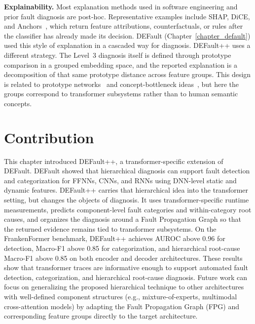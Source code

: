 \textbf{Explainability.}
Most explanation methods used in software engineering and prior fault diagnosis are post-hoc. Representative examples include SHAP, DiCE, and Anchors~\cite{lundberg2017unified,mothilal2020dice,ribeiro2018anchors}, which return feature attributions, counterfactuals, or rules after the classifier has already made its decision. DEFault (Chapter~\ref{chapter_default}) used this style of explanation in a cascaded way for diagnosis. DEFault++ uses a different strategy. The Level~3 diagnosis itself is defined through prototype comparison in a grouped embedding space, and the reported explanation is a decomposition of that same prototype distance across feature groups. This design is related to prototype networks~\cite{snell2017prototypical} and concept-bottleneck ideas~\cite{koh2020concept}, but here the groups correspond to transformer subsystems rather than to human semantic concepts.


\section{Contribution}
\label{sec:defaultpp_summary}

This chapter introduced DEFault++, a transformer-specific extension of DEFault. DEFault showed that hierarchical diagnosis can support fault detection and categorization for FFNNs, CNNs, and RNNs using DNN-level static and dynamic features. DEFault++ carries that hierarchical idea into the transformer setting, but changes the objects of diagnosis. It uses transformer-specific runtime measurements, predicts component-level fault categories and within-category root causes, and organizes the diagnosis around a Fault Propagation Graph so that the returned evidence remains tied to transformer subsystems. On the FrankenFormer benchmark, DEFault++ achieves AUROC above 0.96 for detection, Macro-F1 above 0.85 for categorization, and hierarchical root-cause Macro-F1 above 0.85 on both encoder and decoder architectures. These results show that transformer traces are informative enough to support automated fault detection, categorization, and hierarchical root-cause diagnosis. Future work can focus on generalizing the proposed hierarchical technique to other architectures with well-defined component structures (e.g., mixture-of-experts, multimodal cross-attention models) by adapting the Fault Propagation Graph (FPG) and corresponding feature groups directly to the target architecture. 